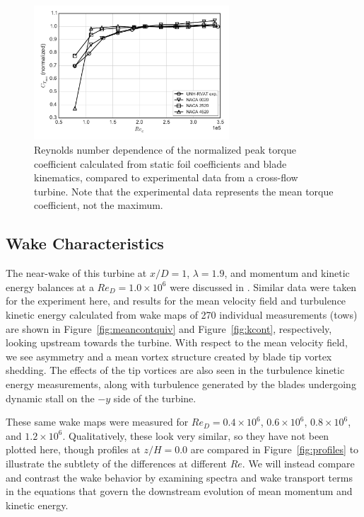 \documentclass[energies,article,accept,moreauthors,pdftex,12pt,a4paper]{mdpi}
\begin{document}
\begin{figure}[ht!]
\centering

\includegraphics[width=0.65\textwidth]{figures/cft_re_dep_foils}

\caption{Reynolds number dependence of the normalized peak torque coefficient
    calculated from static foil coefficients and blade kinematics, compared to
    experimental data from a cross-flow turbine. Note that the experimental data
    represents the mean torque coefficient, not the maximum.}

\label{fig:foils-C_T-Re-dep}
\end{figure}


\subsection{Wake Characteristics}

The near-wake of this turbine at $x/D=1$, $\lambda=1.9$, and momentum and
kinetic energy balances at a $Re_D = 1.0 \times 10^6$ were discussed in
\cite{Bachant2015-JoT}. Similar data were taken for the experiment here, and
results for the mean velocity field and turbulence kinetic energy calculated
from wake maps of 270 individual measurements (tows) are shown in
Figure~\ref{fig:meancontquiv} and Figure~\ref{fig:kcont}, respectively, looking
upstream towards the turbine. With respect to the mean velocity field, we see
asymmetry and a mean vortex structure created by blade tip vortex shedding. The
effects of the tip vortices are also seen in the turbulence kinetic energy
measurements, along with turbulence generated by the blades undergoing dynamic
stall on the $-y$ side of the turbine.

These same wake maps were measured for $Re_D = 0.4 \times 10^6$, $0.6 \times
10^6$, $0.8 \times 10^6$, and $1.2 \times 10^6$. Qualitatively, these look very
similar, so they have not been plotted here, though profiles at $z/H=0.0$ are
compared in Figure~\ref{fig:profiles} to illustrate the subtlety of the
differences at different $Re$. We will instead compare and contrast the wake
behavior by examining spectra and wake transport terms in the equations that
govern the downstream evolution of mean momentum and kinetic energy.
\end{document}
